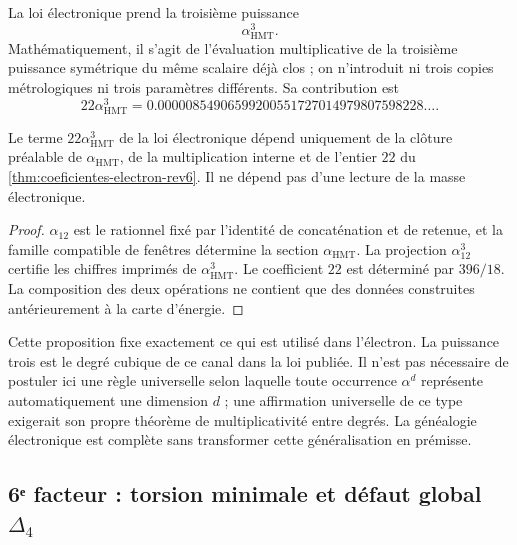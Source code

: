 La loi électronique prend la troisième puissance
\[
 \alpha_{\mathrm{HMT}}^3.
\]
Mathématiquement, il s'agit de l'évaluation multiplicative de la troisième
puissance symétrique du même scalaire déjà clos ; on n'introduit ni trois
copies métrologiques ni trois paramètres différents. Sa contribution est
\[
 22\alpha_{\mathrm{HMT}}^3
 =
 0.00000854906599200551727014979807598228\ldots.
\]

\begin{proposition}
\label{prop:alpha-cubica-electron-rev6}
Le terme \(22\alpha_{\mathrm{HMT}}^3\) de la loi électronique dépend
uniquement de la clôture préalable de \(\alpha_{\mathrm{HMT}}\), de la
multiplication interne et de l'entier \(22\) du
\cref{thm:coeficientes-electron-rev6}. Il ne dépend pas d'une lecture de la
masse électronique.
\end{proposition}

\begin{proof}
\(\alpha_{12}\) est le rationnel fixé par l'identité de concaténation et de
retenue, et la famille compatible de fenêtres détermine la section
\(\alpha_{\mathrm{HMT}}\). La projection \(\alpha_{12}^3\) certifie les
chiffres imprimés de \(\alpha_{\mathrm{HMT}}^3\).
Le coefficient \(22\) est déterminé par \(396/18\). La composition des
deux opérations ne contient que des données construites antérieurement à la
carte d'énergie.
\end{proof}

Cette proposition fixe exactement ce qui est utilisé dans l'électron. La puissance
trois est le degré cubique de ce canal dans la loi publiée. Il n'est pas nécessaire
de postuler ici une règle universelle selon laquelle toute occurrence
\(\alpha^d\) représente automatiquement une dimension \(d\) ; une
affirmation universelle de ce type exigerait son propre théorème de
multiplicativité entre degrés. La généalogie électronique est complète
sans transformer cette généralisation en prémisse.

\subsection{6ᵉ facteur : torsion minimale et défaut global \(\Delta_4\)}

